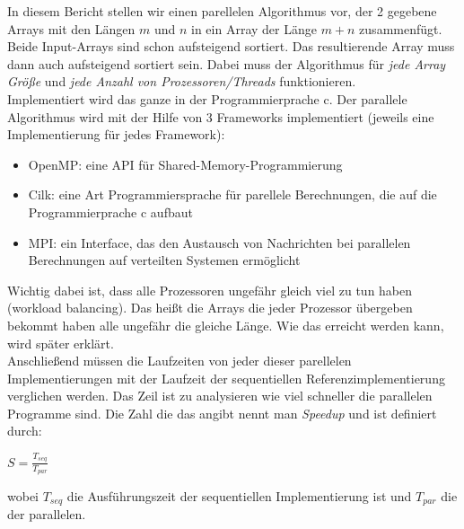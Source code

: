 In diesem Bericht stellen wir einen parellelen Algorithmus vor, der 2 gegebene Arrays mit den Längen $m$ und $n$ in ein Array der Länge $m + n$ zusammenfügt. Beide Input-Arrays sind schon aufsteigend sortiert. Das resultierende Array muss dann auch aufsteigend sortiert sein. Dabei muss der Algorithmus für \emph{jede Array Größe} und \emph{jede Anzahl von Prozessoren/Threads} funktionieren.\\
Implementiert wird das ganze in der Programmierprache c. Der parallele Algorithmus wird mit der Hilfe von 3  Frameworks implementiert (jeweils eine Implementierung für jedes Framework):
\begin{itemize}
\item OpenMP: eine API für Shared-Memory-Programmierung
\item Cilk: eine Art Programmiersprache für parellele Berechnungen, die auf die Programmierprache c aufbaut
\item MPI: ein Interface, das den Austausch von Nachrichten  bei parallelen Berechnungen auf verteilten Systemen ermöglicht
\end{itemize}
Wichtig dabei ist, dass alle Prozessoren ungefähr gleich viel zu tun haben (workload balancing). Das heißt die Arrays die jeder Prozessor übergeben bekommt haben alle ungefähr die gleiche Länge. Wie das erreicht werden kann, wird später erklärt.\\
Anschließend müssen die Laufzeiten von jeder dieser parellelen Implementierungen mit der Laufzeit der sequentiellen Referenzimplementierung verglichen werden. Das Zeil ist zu analysieren wie viel schneller die parallelen Programme sind. Die Zahl die das angibt nennt man \emph{Speedup} und ist definiert durch:
\begin{center}
$ S = \frac{T_{seq}}{T_{par}}$
\end{center}
wobei $T_{seq}$ die Ausführungszeit der sequentiellen Implementierung ist und $T_{par}$ die der parallelen.